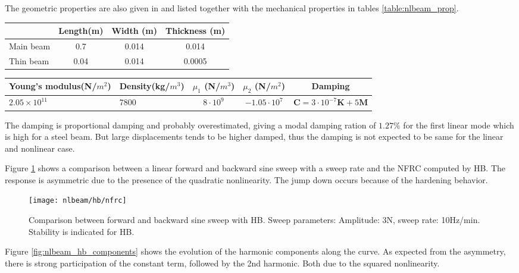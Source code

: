 The geometric properties are also given in \autocite{lenaerts2003a} and listed
together with the mechanical properties in tables \ref{table:nlbeam_prop}.
\begin{center}
\begin{tabular}{l*{3}{c}}
  & Length(m) & Width (m) & Thickness (m) \\
  \hline
  Main beam & 0.7 & 0.014 & 0.014 \\
  Thin beam & 0.04 & 0.014 & 0.0005 \\
  \hline
\end{tabular}
\begin{tabular}{p{3.1cm}p{2cm}*{3}{c}}
  Young's modulus\newline (N/$m^2$) & Density\newline (kg/$m^3$) & $\mu_1$ (N/$m^3$) & $\mu_2$ (N/$m^2$) & Damping  \\
  \hline
  $2.05\times 10^{11}$ & 7800 & $8\cdot 10^{9}$ & $-1.05\cdot 10^{7}$ &  $\bm C = 3 \cdot 10^{-7} \bm K + 5\bm M$ \\
  \hline
\end{tabular}
\label{table:nlbeam_prop}
\end{center}


The damping is proportional damping and probably overestimated, giving a modal
damping ration of $1.27\%$ for the first linear mode which is high for a steel
beam. But large displacements tends to be higher damped, thus the damping is not
expected to be same for the linear and nonlinear case.

Figure \ref{fig:nlbeam_sweep} shows a comparison between a linear forward and
backward sine sweep with a sweep rate and the NFRC computed by HB. The response
is asymmetric due to the presence of the quadratic nonlinearity. The jump down
occurs because of the hardening behavior.

\begin{figure}[!ht]
  \centering
  \texttt{[image: nlbeam/hb/nfrc]}
  \caption{Comparison between forward and backward sine sweep with HB. Sweep
    parameters: Amplitude: 3N, sweep rate: 10Hz/min. Stability is indicated for
    HB.}
  \label{fig:nlbeam_sweep}
\end{figure}

Figure \ref{fig:nlbeam_hb_components} shows the evolution of the harmonic
components along the curve. As expected from the asymmetry, there is strong
participation of the constant term, followed by the 2nd harmonic. Both due to
the squared nonlinearity.

